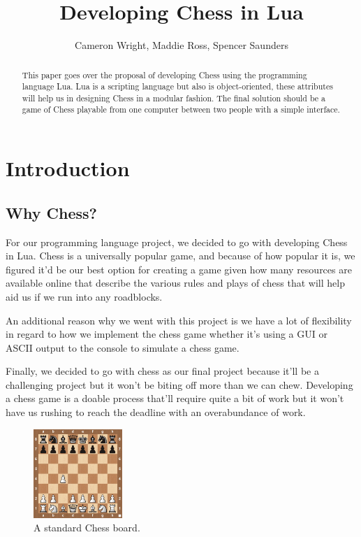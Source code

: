 \documentclass[a4paper]{article}
\title{Developing Chess in Lua}
\author{Cameron Wright, Maddie Ross, Spencer Saunders}
\begin{document}
\maketitle

\begin{abstract}
This paper goes over the proposal of developing Chess using the programming language Lua.  Lua is a scripting language but also is object-oriented, these attributes will help us in designing Chess in a modular fashion.  The final solution should be a game of Chess playable from one computer between two people with a simple interface.  
\end{abstract}

\section{Introduction}

\subsection{Why Chess?}
For our programming language project, we decided to go with developing Chess in Lua. Chess is a universally popular game, and because of how popular it is, we figured it'd be our best option for creating a game given how many resources are available online that describe the various rules and plays of chess that will help aid us if we run into any roadblocks. 

An additional reason why we went with this project is we have a lot of flexibility in regard to how we implement the chess game whether it's using a GUI or ASCII output to the console to simulate a chess game.

Finally, we decided to go with chess as our final project because it'll be a challenging project but it won't be biting off more than we can chew. Developing a chess game is a doable process that'll require quite a bit of work but it won't have us rushing to reach the deadline with an overabundance of work.

\begin{figure}
\centering
\includegraphics[width=0.3\textwidth]{chessboard.jpg}
\caption{\label{fig:Chess}A standard Chess board.}
\end{figure}
\end{document}
